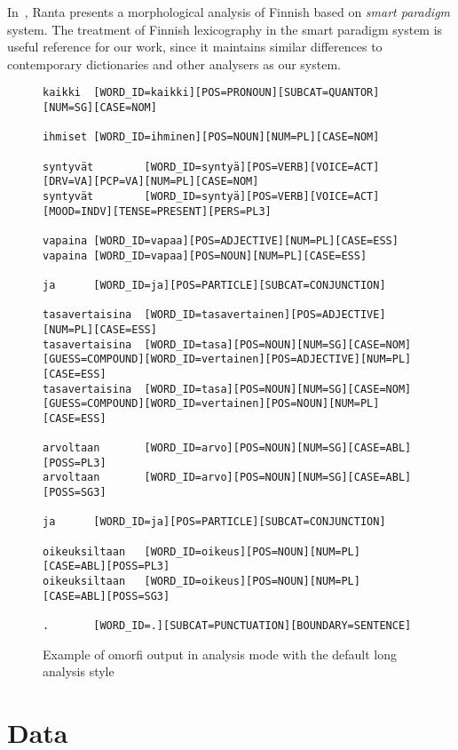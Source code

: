 \documentclass[a4paper,12pt]{article}
\begin{document}
In~\cite{ranta2008predictable}, Ranta presents a morphological analysis of
Finnish based on \emph{smart paradigm} system. The treatment of Finnish
lexicography in the smart paradigm system is useful reference for our work,
since it maintains similar differences to contemporary dictionaries and other
analysers as our system. 

\begin{figure}
    \begin{scriptsize}
\begin{verbatim}
kaikki  [WORD_ID=kaikki][POS=PRONOUN][SUBCAT=QUANTOR][NUM=SG][CASE=NOM]

ihmiset [WORD_ID=ihminen][POS=NOUN][NUM=PL][CASE=NOM]

syntyvät        [WORD_ID=syntyä][POS=VERB][VOICE=ACT][DRV=VA][PCP=VA][NUM=PL][CASE=NOM]
syntyvät        [WORD_ID=syntyä][POS=VERB][VOICE=ACT][MOOD=INDV][TENSE=PRESENT][PERS=PL3]

vapaina [WORD_ID=vapaa][POS=ADJECTIVE][NUM=PL][CASE=ESS]
vapaina [WORD_ID=vapaa][POS=NOUN][NUM=PL][CASE=ESS]

ja      [WORD_ID=ja][POS=PARTICLE][SUBCAT=CONJUNCTION]

tasavertaisina  [WORD_ID=tasavertainen][POS=ADJECTIVE][NUM=PL][CASE=ESS]
tasavertaisina  [WORD_ID=tasa][POS=NOUN][NUM=SG][CASE=NOM][GUESS=COMPOUND][WORD_ID=vertainen][POS=ADJECTIVE][NUM=PL][CASE=ESS]
tasavertaisina  [WORD_ID=tasa][POS=NOUN][NUM=SG][CASE=NOM][GUESS=COMPOUND][WORD_ID=vertainen][POS=NOUN][NUM=PL][CASE=ESS]

arvoltaan       [WORD_ID=arvo][POS=NOUN][NUM=SG][CASE=ABL][POSS=PL3]
arvoltaan       [WORD_ID=arvo][POS=NOUN][NUM=SG][CASE=ABL][POSS=SG3]

ja      [WORD_ID=ja][POS=PARTICLE][SUBCAT=CONJUNCTION]

oikeuksiltaan   [WORD_ID=oikeus][POS=NOUN][NUM=PL][CASE=ABL][POSS=PL3]
oikeuksiltaan   [WORD_ID=oikeus][POS=NOUN][NUM=PL][CASE=ABL][POSS=SG3]

.       [WORD_ID=.][SUBCAT=PUNCTUATION][BOUNDARY=SENTENCE]
\end{verbatim}
    \end{scriptsize}
    \caption{Example of omorfi output in analysis mode with the default
        long analysis style \label{fig:output}}
\end{figure}


\section{Data}
\end{document}
